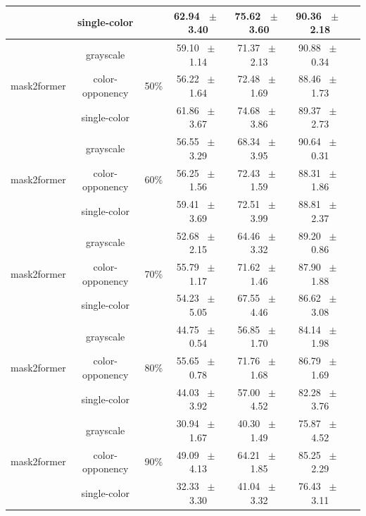 \begin{table}[h]
\begin{tabular}{@{}lccc ccc@{}}
    & single-color &  & 62.94 ~$\pm$~ 3.40 & 75.62 ~$\pm$~ 3.60 & 90.36 ~$\pm$~ 2.18 \\
    \midrule
    \multirow{3}{*}{mask2former} & grayscale & \multirow{3}{*}{50\%} & 59.10 ~$\pm$~ 1.14 & 71.37 ~$\pm$~ 2.13 & 90.88 ~$\pm$~ 0.34 \\
    & color-opponency &  & 56.22 ~$\pm$~ 1.64 & 72.48 ~$\pm$~ 1.69 & 88.46 ~$\pm$~ 1.73 \\
    & single-color &  & 61.86 ~$\pm$~ 3.67 & 74.68 ~$\pm$~ 3.86 & 89.37 ~$\pm$~ 2.73 \\
    \midrule
    \multirow{3}{*}{mask2former} & grayscale & \multirow{3}{*}{60\%} & 56.55 ~$\pm$~ 3.29 & 68.34 ~$\pm$~ 3.95 & 90.64 ~$\pm$~ 0.31 \\
    & color-opponency &  & 56.25 ~$\pm$~ 1.56 & 72.43 ~$\pm$~ 1.59 & 88.31 ~$\pm$~ 1.86 \\
    & single-color &  & 59.41 ~$\pm$~ 3.69 & 72.51 ~$\pm$~ 3.99 & 88.81 ~$\pm$~ 2.37 \\
    \midrule
    \multirow{3}{*}{mask2former} & grayscale & \multirow{3}{*}{70\%} & 52.68 ~$\pm$~ 2.15 & 64.46 ~$\pm$~ 3.32 & 89.20 ~$\pm$~ 0.86 \\
    & color-opponency &  & 55.79 ~$\pm$~ 1.17 & 71.62 ~$\pm$~ 1.46 & 87.90 ~$\pm$~ 1.88 \\
    & single-color &  & 54.23 ~$\pm$~ 5.05 & 67.55 ~$\pm$~ 4.46 & 86.62 ~$\pm$~ 3.08 \\
    \midrule
    \multirow{3}{*}{mask2former} & grayscale & \multirow{3}{*}{80\%} & 44.75 ~$\pm$~ 0.54 & 56.85 ~$\pm$~ 1.70 & 84.14 ~$\pm$~ 1.98 \\
    & color-opponency &  & 55.65 ~$\pm$~ 0.78 & 71.76 ~$\pm$~ 1.68 & 86.79 ~$\pm$~ 1.69 \\
    & single-color &  & 44.03 ~$\pm$~ 3.92 & 57.00 ~$\pm$~ 4.52 & 82.28 ~$\pm$~ 3.76 \\
    \midrule
    \multirow{3}{*}{mask2former} & grayscale & \multirow{3}{*}{90\%} & 30.94 ~$\pm$~ 1.67 & 40.30 ~$\pm$~ 1.49 & 75.87 ~$\pm$~ 4.52 \\
    & color-opponency &  & 49.09 ~$\pm$~ 4.13 & 64.21 ~$\pm$~ 1.85 & 85.25 ~$\pm$~ 2.29 \\
    & single-color &  & 32.33 ~$\pm$~ 3.30 & 41.04 ~$\pm$~ 3.32 & 76.43 ~$\pm$~ 3.11 \\
    \midrule
    \bottomrule
  \end{tabular}
  \label{tab:sparse_results_mask2former_acdc_fog}
\end{table}